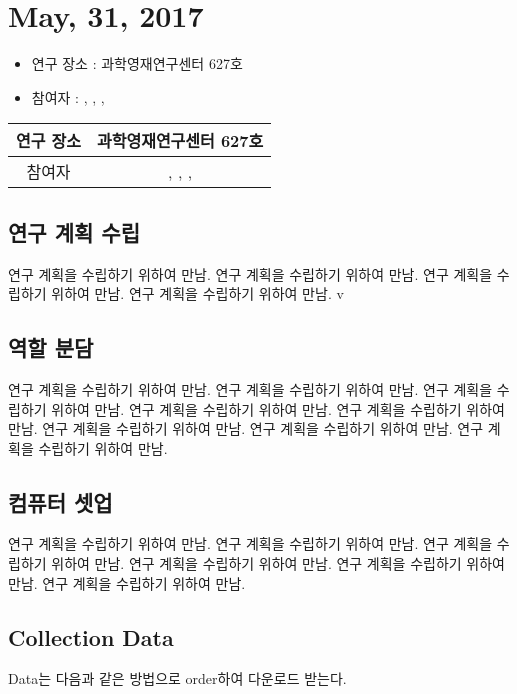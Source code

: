 \section*{May, 31, 2017}

\begin{itemize}
	\item{연구 장소 : 과학영재연구센터 627호}
	\item{참여자 : \@Author, \@secondAuthor, \@thirdAuthor, \@fourthAuthor}
\end{itemize}

	\begin{table}[h]
		\label{table01}
		\begin{tabular}{|c|c|} 
			\hline
			연구 장소   &   과학영재연구센터 627호 \\ 
			\hline
			참여자   &   {\@firstAuthor}, \@secondAuthor, \@thirdAuthor, \@fourthAuthor  \\
			\hline
		\end{tabular}
	\end{table}

	\subsection*{연구 계획 수립}
							연구 계획을 수립하기 위하여 만남.
							연구 계획을 수립하기 위하여 만남.
								연구 계획을 수립하기 위하여 만남.
									연구 계획을 수립하기 위하여 만남.
									v
	
    \subsection*{역할 분담}
			연구 계획을 수립하기 위하여 만남.
				연구 계획을 수립하기 위하여 만남.
					연구 계획을 수립하기 위하여 만남.
						연구 계획을 수립하기 위하여 만남.
							연구 계획을 수립하기 위하여 만남.
								연구 계획을 수립하기 위하여 만남.
									연구 계획을 수립하기 위하여 만남.
										연구 계획을 수립하기 위하여 만남.
	\subsection*{컴퓨터 셋업}
		연구 계획을 수립하기 위하여 만남.
			연구 계획을 수립하기 위하여 만남.
				연구 계획을 수립하기 위하여 만남.
					연구 계획을 수립하기 위하여 만남.
						연구 계획을 수립하기 위하여 만남.
							연구 계획을 수립하기 위하여 만남.

	\subsection*{Collection Data}
     Data는 다음과 같은 방법으로 order하여 다운로드 받는다.


